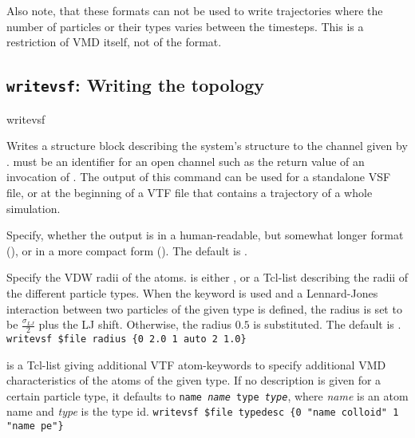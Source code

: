 Also note, that these formats can not be used to write trajectories
where the number of particles or their types varies between the
timesteps. This is a restriction of VMD itself, not of the format.

\subsection{\texttt{writevsf}: Writing the topology}

\begin{essyntax}
  writevsf  
\end{essyntax}
Writes a structure block describing the system's structure to the
channel given by .  must be an
identifier for an open channel such as the return value of an
invocation of .  The output of this command can be used
for a standalone VSF file, or at the beginning of a VTF file that
contains a trajectory of a whole simulation.

\begin{arguments}
\item[\opt{\alt{short \asep verbose}}]
  Specify, whether the output is in a human-readable, but somewhat
  longer format (), or in a more compact form
  (). The default is .
  
\item[\opt{radius \alt{\var{radii} \asep auto}}] Specify the VDW radii
  of the atoms.  is either , or a Tcl-list
  describing the radii of the different particle types. When the
  keyword  is used and a Lennard-Jones interaction
  between two particles of the given type is defined, the radius is
  set to be $\frac{\sigma_{LJ}}{2}$ plus the LJ shift.  Otherwise, the
  radius $0.5$ is substituted. The default is .
  \verb!writevsf $file radius {0 2.0 1 auto 2 1.0}!

\item[\opt{typedesc \var{typedesc}}]
   is a Tcl-list giving additional VTF atom-keywords to
  specify additional VMD characteristics of the atoms of the given type.
  If no description is given for a certain particle type, it defaults to
  \texttt{name \textit{name} type \textit{type}}, where \textit{name}
  is an atom name and \textit{type} is the type id.
  \verb!writevsf $file typedesc {0 "name colloid" 1 "name pe"}!
\end{arguments}

